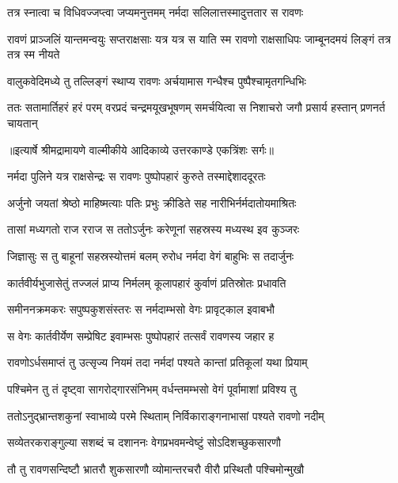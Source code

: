 \twolineshloka
{तत्र स्नात्वा च विधिवज्जप्त्वा जप्यमनुत्तमम्}
{नर्मदा सलिलात्तस्मादुत्ततार स रावणः} %

\threelineshloka
{रावणं प्राञ्जलिं यान्तमन्वयुः सप्तराक्षसाः}
{यत्र यत्र स याति स्म रावणो राक्षसाधिपः}
{जाम्बूनदमयं लिङ्गं तत्र तत्र स्म नीयते} %

\twolineshloka
{वालुकवेदिमध्ये तु तल्लिङ्गं स्थाप्य रावणः}
{अर्चयामास गन्धैश्च पुष्पैश्चामृतगन्धिभिः} %

\fourlineindentedshloka
{ततः सतामार्तिहरं हरं परम्}
{वरप्रदं चन्द्रमयूखभूषणम्}
{समर्चयित्वा स निशाचरो जगौ}
{प्रसार्य हस्तान् प्रणनर्त चायतान्} %


{॥इत्यार्षे श्रीमद्रामायणे वाल्मीकीये आदिकाव्ये उत्तरकाण्डे एकत्रिंशः सर्गः॥}


\twolineshloka
{नर्मदा पुलिने यत्र राक्षसेन्द्रः स रावणः}
{पुष्पोपहारं कुरुते तस्माद्देशाददूरतः} %

\twolineshloka
{अर्जुनो जयतां श्रेष्ठो माहिष्मत्याः पतिः प्रभुः}
{क्रीडिते सह नारीभिर्नर्मदातोयमाश्रितः} %

\twolineshloka
{तासां मध्यगतो राज रराज स ततोऽर्जुनः}
{करेणूनां सहस्रस्य मध्यस्थ इव कुञ्जरः} %

\twolineshloka
{जिज्ञासुः स तु बाहूनां सहस्रस्योत्तमं बलम्}
{रुरोध नर्मदा वेगं बाहुभिः स तदार्जुनः} %

\twolineshloka
{कार्तवीर्यभुजासेतुं तज्जलं प्राप्य निर्मलम्}
{कूलापहारं कुर्वाणं प्रतिस्रोतः प्रधावति} %

\twolineshloka
{समीननक्रमकरः सपुष्पकुशसंस्तरः}
{स नर्मदाम्भसो वेगः प्रावृट्काल इवाबभौ} %

\twolineshloka
{स वेगः कार्तवीर्येण सम्प्रेषिट इवाम्भसः}
{पुष्पोपहारं तत्सर्वं रावणस्य जहार ह} %

\twolineshloka
{रावणोऽर्धसमाप्तं तु उत्सृज्य नियमं तदा}
{नर्मदां पश्यते कान्तां प्रतिकूलां यथा प्रियाम्} %

\twolineshloka
{पश्चिमेन तु तं दृष्ट्वा सागरोद्गारसंनिभम्}
{वर्धन्तमम्भसो वेगं पूर्वामाशां प्रविश्य तु} %

\twolineshloka
{ततोऽनुद्भ्रान्तशकुनां स्वाभाव्ये परमे स्थिताम्}
{निर्विकाराङ्गनाभासां पश्यते रावणो नदीम्} %

\twolineshloka
{सव्येतरकराङ्गुल्या सशब्दं च दशाननः}
{वेगप्रभवमन्वेष्टुं सोऽदिशच्छुकसारणौ} %

\twolineshloka
{तौ तु रावणसन्दिष्टौ भ्रातरौ शुकसारणौ}
{व्योमान्तरचरौ वीरौ प्रस्थितौ पश्चिमोन्मुखौ} %

